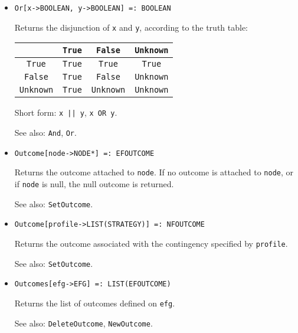 \begin{itemize}

\item{} 
\protect \large \begin{verbatim}
Or[x->BOOLEAN, y->BOOLEAN] =: BOOLEAN 
\end{verbatim} \normalsize
  
\bd
Returns the disjunction of \verb+x+ and \verb+y+, according to the truth
table:
\begin{center}
\begin{tabular} {|c||c|c|c|} \hline
& \verb+True+ & \verb+False+ & \verb+Unknown+ \\ \hline 
\verb+True+ & \verb+True+ & \verb+True+ & \verb+True+ \\
\verb+False+ & \verb+True+ & \verb+False+ & \verb+Unknown+ \\
\verb+Unknown+ & \verb+True+ & \verb+Unknown+ & \verb+Unknown+ \\ \hline
\end{tabular}
\end{center}
\item
[Short form:] \verb+x || y+, \verb+x OR y+.
\item [See also:] \verb+And+, \verb+Or+.
\ed

\item{}
\protect \large \begin{verbatim}
Outcome[node->NODE*] =: EFOUTCOME 
\end{verbatim}\normalsize

\bd
Returns the outcome attached to \verb+node+.  If no outcome is attached
to \verb+node+, or if \verb+node+ is null, the null outcome is returned.
\item [See also:] \verb+SetOutcome+.
\ed

\item{}
\protect \large \begin{verbatim}
Outcome[profile->LIST(STRATEGY)] =: NFOUTCOME 
\end{verbatim}\normalsize

\bd
Returns the outcome associated with the contingency specified by
\verb+profile+.
\item [See also:] \verb+SetOutcome+.
\ed

\item{}
\protect \large \begin{verbatim}
Outcomes[efg->EFG] =: LIST(EFOUTCOME) 
\end{verbatim}\normalsize

\bd
Returns the list of outcomes defined on \verb+efg+.
\item [See also:] \verb+DeleteOutcome+, \verb+NewOutcome+.
\ed


\end{itemize}
